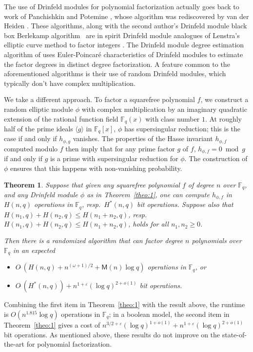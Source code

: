 \documentclass[12pt]{article}
\theoremstyle{plain}
\newtheorem{theorem}{Theorem}
\theoremstyle{definition}
\newcommand{\tildO}{O\tilde{~}}
\def\F{\ensuremath{\mathbb{F}}}
\def\MM{\ensuremath{\mathsf{M}}}
\begin{document}
The use of Drinfeld modules for polynomial factorization actually
goes back to work of Panchishkin and Potemine \cite{pp}, whose algorithm was
rediscovered by van der Heiden \cite{vdH}. These algorithms, along
with the second author's Drinfeld module black box Berlekamp
algorithm~\cite{nar} are in spirit Drinfeld module analogues of
Lenstra's elliptic curve method to factor integers \cite{len}. The
Drinfeld module degree estimation algorithm of \cite{nar} uses
Euler-Poincar\'e characteristics of Drinfeld modules to estimate the
factor degrees in distinct degree factorization. A feature common to
the aforementioned algorithms is their use of random Drinfeld modules,
which typically don't have complex multiplication.

We take a different approach. To factor a squarefree polynomial $f$,
we construct a random elliptic module $\phi$ with complex
multiplication by an imaginary quadratic extension of the rational
function field $\F_q(x)$ with class number $1$. At roughly half of the
prime ideals $\langle g \rangle$ in $\F_q[x]$, $\phi$ has
supersingular reduction; this is the case if and only if $h_{\phi,g}$
vanishes. The properties of the Hasse invariant $h_{\phi,f}$ computed
modulo $f$ then imply that for any prime factor $g$ of $f$,
$h_{\phi,f} = 0 \bmod g$ if and only if $g$ is a prime with
supersingular reduction for $\phi$. The construction of $\phi$ ensures
that this happens with non-vanishing probability.

\begin{theorem}
  \label{theo:main-factor}
  Suppose that given any squarefree polynomial $f$ of degree $n$ over
  $\F_q$, and any Drinfeld module $\phi$ as in Theorem~\ref{theo:1},
  one can compute $h_{\phi,f}$ in $H(n,q)$ operations in $\F_q$, resp.\
  $H^*(n,q)$ bit operations. Suppose also that $H(n_1,q)+H(n_2,q) \le
  H(n_1+n_2,q)$, resp.\ $H(n_1,q)+H(n_2,q) \le H(n_1+n_2,q)$, holds for
  all $n_1,n_2 \ge 0$.

  Then there is a randomized algorithm that can factor degree $n$
  polynomials over $\F_q$ in an expected
  \begin{itemize}
\item $\tildO(H(n,q)  + n^{(\omega+1)/2} + \MM(n)\log q )$ operations in $\F_q$, or
\item $\tildO(H^*(n,q)) + n^{1+\varepsilon}(\log q)^{2+o(1)}$ bit operations.
  \end{itemize}
\end{theorem}
Combining the first item in Theorem~\ref{theo:1} with the result
above, the runtime is $O(n^{1.815}\log q)$ operations in $\F_q$; in a
boolean model, the second item in Theorem~\ref{theo:1} gives a cost of
$n^{3/2+\varepsilon} (\log q)^{1 +o(1)} + n^{1+\varepsilon}(\log
q)^{2+o(1)}$ bit operations. As mentioned above, these results do not
improve on the state-of-the-art for polynomial factorization.
\end{document}
